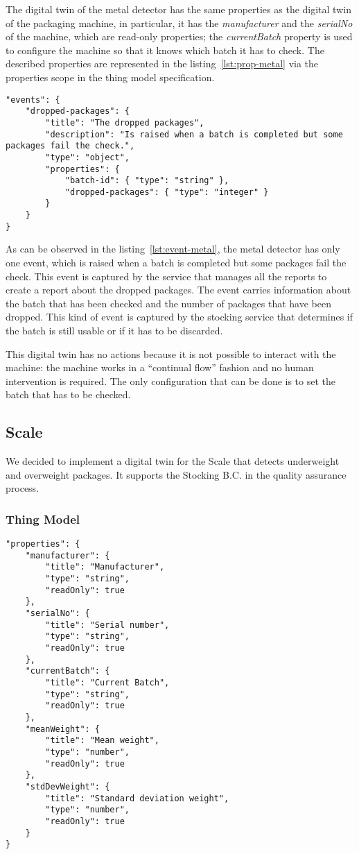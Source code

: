 The digital twin of the metal detector has the same properties as the digital twin of the packaging machine, in particular, it has the \textit{manufacturer} and the \textit{serialNo} of the machine, which are read-only properties; the \textit{currentBatch} property is used to configure the machine so that it knows which batch it has to check. The described properties are represented in the listing~\ref{lst:prop-metal} via the properties
scope in the thing model specification.

\begin{lstlisting}[caption={Events of the metal detector Thing Model.},label={lst:event-metal}]
"events": {
	"dropped-packages": {
		"title": "The dropped packages",
		"description": "Is raised when a batch is completed but some packages fail the check.",
		"type": "object",
		"properties": {
			"batch-id": { "type": "string" },
			"dropped-packages": { "type": "integer" }
		}
	}
}
\end{lstlisting}

As can be observed in the listing~\ref{lst:event-metal}, the metal detector has only one event, which is raised when a batch is completed but some packages fail the check. This event is captured by the service that manages all the reports to create a report about the dropped packages.
The event carries information about the batch that has been checked and the number of packages that have been dropped.
This kind of event is captured by the stocking service that determines if the batch is still usable or if it has to be discarded.

This digital twin has no actions because it is not possible to interact with the machine: the machine works in a ``continual flow'' fashion and no human intervention is required. The only configuration that can be done is to set the batch that has to be checked.

\subsection{Scale}
We decided to implement a digital twin for the Scale that detects underweight and overweight packages.
It supports the Stocking B.C. in the quality assurance process.

\subsubsection{Thing Model}

\begin{lstlisting}[caption={Properties of the scale Thing Model.},label={lst:prop-scale}]
"properties": {
	"manufacturer": {
		"title": "Manufacturer",
		"type": "string",
		"readOnly": true
	},
	"serialNo": {
		"title": "Serial number",
		"type": "string",
		"readOnly": true
	},
	"currentBatch": {
		"title": "Current Batch",
		"type": "string",
		"readOnly": true
	},
	"meanWeight": {
		"title": "Mean weight",
		"type": "number",
		"readOnly": true
	},
	"stdDevWeight": {
		"title": "Standard deviation weight",
		"type": "number",
		"readOnly": true
	}
}
\end{lstlisting}

